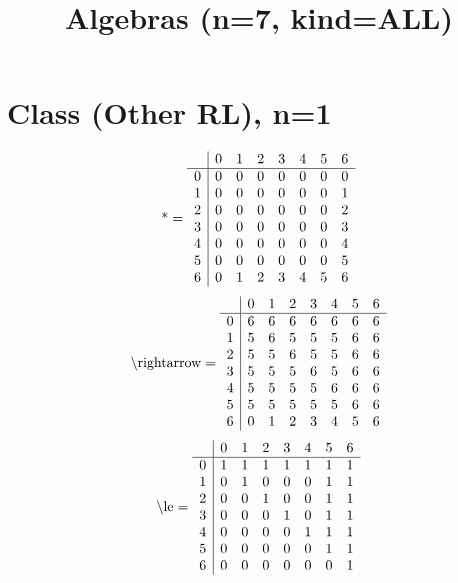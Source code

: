 \documentclass[11pt]{article}
\title{Algebras (n=7, kind=ALL)}
\date{}
\begin{document}
\maketitle
\tableofcontents
\section{Class (Other RL), n=1}
\[\text{*} = 
\begin{array}{r | r r r r r r r}
 & 0 & 1 & 2 & 3 & 4 & 5 & 6 \\ \hline
0 & 0 & 0 & 0 & 0 & 0 & 0 & 0 \\
1 & 0 & 0 & 0 & 0 & 0 & 0 & 1 \\
2 & 0 & 0 & 0 & 0 & 0 & 0 & 2 \\
3 & 0 & 0 & 0 & 0 & 0 & 0 & 3 \\
4 & 0 & 0 & 0 & 0 & 0 & 0 & 4 \\
5 & 0 & 0 & 0 & 0 & 0 & 0 & 5 \\
6 & 0 & 1 & 2 & 3 & 4 & 5 & 6 \\
\end{array}
\]
\[\text{\textbackslash rightarrow} = 
\begin{array}{r | r r r r r r r}
 & 0 & 1 & 2 & 3 & 4 & 5 & 6 \\ \hline
0 & 6 & 6 & 6 & 6 & 6 & 6 & 6 \\
1 & 5 & 6 & 5 & 5 & 5 & 6 & 6 \\
2 & 5 & 5 & 6 & 5 & 5 & 6 & 6 \\
3 & 5 & 5 & 5 & 6 & 5 & 6 & 6 \\
4 & 5 & 5 & 5 & 5 & 6 & 6 & 6 \\
5 & 5 & 5 & 5 & 5 & 5 & 6 & 6 \\
6 & 0 & 1 & 2 & 3 & 4 & 5 & 6 \\
\end{array}
\]
\[\text{\textbackslash le} = 
\begin{array}{r | r r r r r r r}
 & 0 & 1 & 2 & 3 & 4 & 5 & 6 \\ \hline
0 & 1 & 1 & 1 & 1 & 1 & 1 & 1 \\
1 & 0 & 1 & 0 & 0 & 0 & 1 & 1 \\
2 & 0 & 0 & 1 & 0 & 0 & 1 & 1 \\
3 & 0 & 0 & 0 & 1 & 0 & 1 & 1 \\
4 & 0 & 0 & 0 & 0 & 1 & 1 & 1 \\
5 & 0 & 0 & 0 & 0 & 0 & 1 & 1 \\
6 & 0 & 0 & 0 & 0 & 0 & 0 & 1 \\
\end{array}
\]
\end{document}

